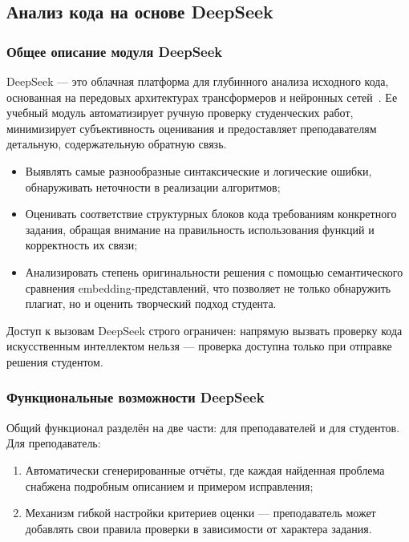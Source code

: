 \subsection{Анализ кода на основе DeepSeek}

\subsubsection{Общее описание модуля DeepSeek}

DeepSeek —  это облачная платформа для глубинного анализа исходного кода, основанная на передовых архитектурах трансформеров и нейронных сетей~\cite{deepseek_docs}. Ее учебный модуль автоматизирует ручную проверку студенческих работ, минимизирует субъективность оценивания и предоставляет преподавателям детальную, содержательную обратную связь.

\begin{itemize}
  \item Выявлять самые разнообразные синтаксические и логические ошибки, обнаруживать неточности в реализации алгоритмов;
  \item Оценивать соответствие структурных блоков кода требованиям конкретного задания, обращая внимание на правильность использования функций и корректность их связи;
  \item Анализировать степень оригинальности решения с помощью семантического сравнения embedding‐представлений, что позволяет не только обнаружить плагиат, но и оценить творческий подход студента.
\end{itemize}

Доступ к вызовам DeepSeek строго ограничен: напрямую вызвать проверку кода искусственным интеллектом нельзя — проверка доступна только при отправке решения студентом.

\subsubsection{Функциональные возможности DeepSeek}

Общий функционал разделён на две части: для преподавателей и для студентов. Для преподаватель:

\begin{enumerate}
    \item Автоматически сгенерированные отчёты, где каждая найденная проблема снабжена подробным описанием и примером исправления;
    \item Механизм гибкой настройки критериев оценки — преподаватель может добавлять свои правила проверки в зависимости от характера задания.
\end{enumerate}

